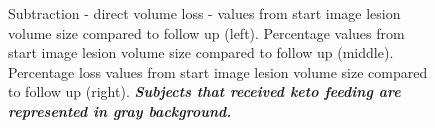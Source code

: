 \begin{figure}[!h]\vspace{-0.5cm}
    \begin{minipage}{1\textwidth}
        \centering
            \begin{minipage}{0.25\linewidth}
                
            \end{minipage}
            \begin{minipage}{0.25\linewidth}%
                
            \end{minipage}
            \begin{minipage}{0.25\linewidth}%
                
            \end{minipage}
    \end{minipage}\vspace{-0.15cm}
   \caption{Subtraction - direct volume loss - values from start image lesion volume size compared to follow up (left). Percentage values from start image lesion volume size compared to follow up (middle). Percentage loss values from start image lesion volume size compared to follow up (right). \emph{\textbf{Subjects that received keto feeding are represented in gray background.}}}
\end{figure}



